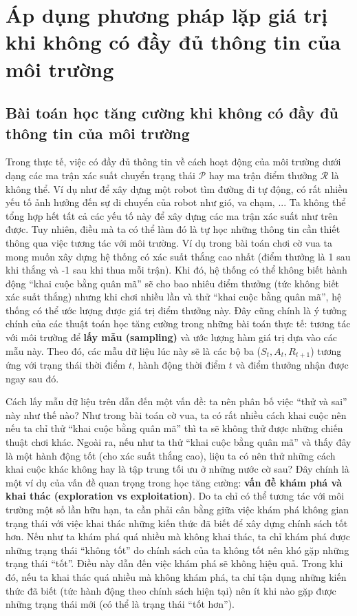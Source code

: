 \section{Áp dụng phương pháp lặp giá trị khi không có đầy đủ thông tin của môi trường}
\subsection{Bài toán học tăng cường khi không có đầy đủ thông tin của môi trường}
Trong thực tế, việc có đầy đủ thông tin về cách hoạt động của môi trường dưới dạng các ma trận xác suất chuyển trạng thái $\mathcal{P}$ hay ma trận điểm thưởng $\mathcal{R}$ là không thể.
Ví dụ như để xây dựng một robot tìm đường đi tự động, có rất nhiều yếu tố ảnh hưởng đến sự di chuyển của robot như gió, va chạm, ...
Ta không thể tổng hợp hết tất cả các yếu tố này để xây dựng các ma trận xác suất như trên được.
Tuy nhiên, điều mà ta có thể làm đó là tự học những thông tin cần thiết thông qua việc tương tác với môi trường.
Ví dụ trong bài toán chơi cờ vua ta mong muốn xây dựng hệ thống có xác suất thắng cao nhất (điểm thưởng là 1 sau khi thắng và -1 sau khi thua mỗi trận).
Khi đó, hệ thống có thể không biết hành động ``khai cuộc bằng quân mã'' sẽ cho bao nhiêu điểm thưởng (tức không biết xác suất thắng) nhưng khi chơi nhiều lần và thử ``khai cuộc bằng quân mã'', hệ thống có thể ước lượng được giá trị điểm thưởng này.
Đây cũng chính là ý tưởng chính của các thuật toán học tăng cường trong những bài toán thực tế: tương tác với môi trường để \textbf{lấy mẫu (sampling)} và ước lượng hàm giá trị dựa vào các mẫu này.
Theo đó, các mẫu dữ liệu lúc này sẽ là các bộ ba ($\mathit{S}_t, \mathit{A}_t, \mathit{R}_{t+1}$) tương ứng với trạng thái thời điểm $t$, hành động thời điểm $t$ và điểm thưởng nhận được ngay sau đó.

Cách lấy mẫu dữ liệu trên dẫn đến một vấn đề: ta nên phân bố việc ``thử và sai'' này như thế nào?
Như trong bài toán cờ vua, ta có rất nhiều cách khai cuộc nên nếu ta chỉ thử ``khai cuộc bằng quân mã'' thì ta sẽ không thử được những chiến thuật chơi khác.
Ngoài ra, nếu như ta thử ``khai cuộc bằng quân mã'' và thấy đây là một hành động tốt (cho xác suất thắng cao), liệu ta có nên thử những cách khai cuộc khác không hay là tập trung tối ưu ở những nước cờ sau?
Đây chính là một ví dụ của vấn đề quan trọng trong học tăng cường: \textbf{vấn đề khám phá và khai thác (exploration vs exploitation)}.
Do ta chỉ có thể tương tác với môi trường một số lần hữu hạn, ta cần phải cân bằng giữa việc khám phá không gian trạng thái với việc khai thác những kiến thức đã biết để xây dựng chính sách tốt hơn.
Nếu như ta khám phá quá nhiều mà không khai thác, ta chỉ khám phá được những trạng thái ``không tốt'' do chính sách của ta không tốt nên khó gặp những trạng thái ``tốt''.
Điều này dẫn đến việc khám phá sẽ không hiệu quả.
Trong khi đó, nếu ta khai thác quá nhiều mà không khám phá, ta chỉ tận dụng những kiến thức đã biết (tức hành động theo chính sách hiện tại) nên ít khi nào gặp được những trạng thái mới (có thể là trạng thái ``tốt hơn'').

